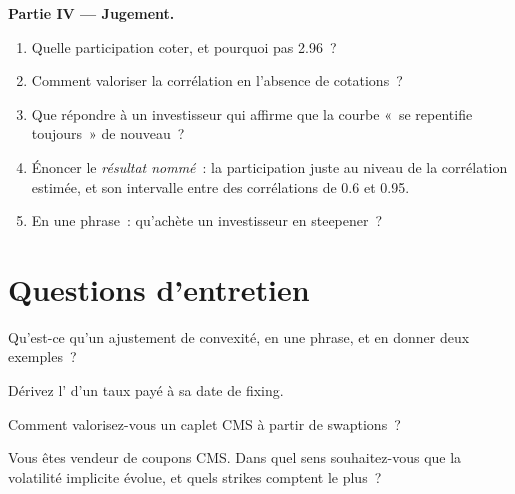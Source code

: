 \begin{problem}
\medskip\noindent\textbf{Partie IV --- Jugement.}
\begin{enumerate}[resume]
\item Quelle participation coter, et pourquoi pas 2.96~?
\item Comment valoriser la corrélation en l'absence de cotations~?
\item Que répondre à un investisseur qui affirme que la courbe «~se repentifie toujours~» de nouveau~?
\item Énoncer le \emph{résultat nommé}~: la participation juste au niveau de la corrélation estimée,
et son intervalle entre des corrélations de 0.6 et 0.95.
\item En une phrase~: qu'achète un investisseur en steepener~?
\end{enumerate}
\end{problem}

\section{Questions d'entretien}

\begin{interviewq}\label{iq:rc:convexity-adjustments-and-constant-maturity-products:1}
Qu'est-ce qu'un ajustement de convexité, en une phrase, et en donner deux exemples~?
\end{interviewq}

\begin{interviewq}\label{iq:rc:convexity-adjustments-and-constant-maturity-products:2}
Dérivez l' d'un taux payé à sa date de fixing.
\end{interviewq}

\begin{interviewq}\label{iq:rc:convexity-adjustments-and-constant-maturity-products:3}
Comment valorisez-vous un caplet CMS à partir de swaptions~?
\end{interviewq}

\begin{interviewq}\label{iq:rc:convexity-adjustments-and-constant-maturity-products:4}
Vous êtes vendeur de coupons CMS. Dans quel sens souhaitez-vous que la volatilité implicite évolue, et
quels strikes comptent le plus~?
\end{interviewq}

